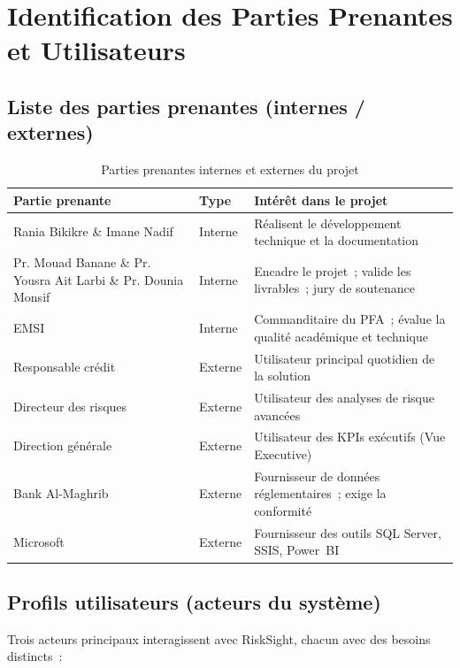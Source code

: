 \documentclass[12pt, a4paper]{report}
\begin{document}
\section{Identification des Parties Prenantes et Utilisateurs}

\subsection{Liste des parties prenantes (internes / externes)}

\begin{table}[H]
\centering
\caption{Parties prenantes internes et externes du projet}
\label{tab:pp_besoins}
\renewcommand{\arraystretch}{1.6}
\begin{tabularx}{\textwidth}{p{3.8cm} p{2cm} X}
\toprule
\rowcolor{primary!12}
Partie prenante & Type & Intérêt dans le projet \\
\midrule
Rania Bikikre \& Imane Nadif & Interne & Réalisent le développement technique et la documentation \\
Pr. Mouad Banane \& Pr. Yousra Ait Larbi \& Pr. Dounia Monsif & Interne & Encadre le projet~; valide les livrables~; jury de soutenance \\
EMSI & Interne & Commanditaire du PFA~; évalue la qualité académique et technique \\
Responsable crédit & Externe & Utilisateur principal quotidien de la solution \\
Directeur des risques & Externe & Utilisateur des analyses de risque avancées \\
Direction générale & Externe & Utilisateur des KPIs exécutifs (Vue Executive) \\
Bank Al-Maghrib & Externe & Fournisseur de données réglementaires~; exige la conformité \\
Microsoft & Externe & Fournisseur des outils SQL Server, SSIS, Power~BI \\
\bottomrule
\end{tabularx}
\end{table}

\subsection{Profils utilisateurs (acteurs du système)}

Trois acteurs principaux interagissent avec RiskSight, chacun avec des besoins
distincts~:
\end{document}
